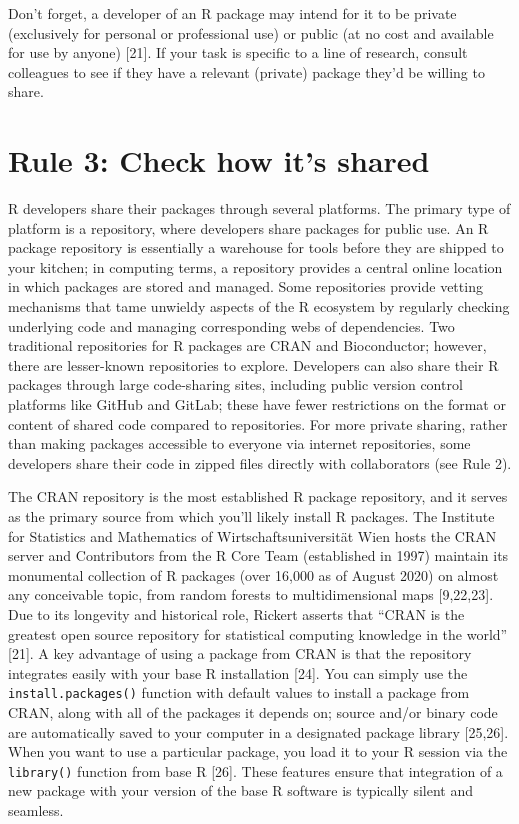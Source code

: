 \documentclass[10pt,letterpaper]{article}
\begin{document}
Don't forget, a developer of an R package may intend for it to be
private (exclusively for personal or professional use) or public (at no
cost and available for use by anyone) {[}21{]}. If your task is specific
to a line of research, consult colleagues to see if they have a relevant
(private) package they'd be willing to share.

\hypertarget{rule-3-check-how-its-shared}{%
\section{Rule 3: Check how it's
shared}\label{rule-3-check-how-its-shared}}

R developers share their packages through several platforms. The primary
type of platform is a repository, where developers share packages for
public use. An R package repository is essentially a warehouse for tools
before they are shipped to your kitchen; in computing terms, a
repository provides a central online location in which packages are
stored and managed. Some repositories provide vetting mechanisms that
tame unwieldy aspects of the R ecosystem by regularly checking
underlying code and managing corresponding webs of dependencies. Two
traditional repositories for R packages are CRAN and Bioconductor;
however, there are lesser-known repositories to explore. Developers can
also share their R packages through large code-sharing sites, including
public version control platforms like GitHub and GitLab; these have
fewer restrictions on the format or content of shared code compared to
repositories. For more private sharing, rather than making packages
accessible to everyone via internet repositories, some developers share
their code in zipped files directly with collaborators (see Rule 2).

The CRAN repository is the most established R package repository, and it
serves as the primary source from which you'll likely install R
packages. The Institute for Statistics and Mathematics of
Wirtschaftsuniversität Wien hosts the CRAN server and Contributors from
the R Core Team (established in 1997) maintain its monumental collection
of R packages (over 16,000 as of August 2020) on almost any conceivable
topic, from random forests to multidimensional maps {[}9,22,23{]}. Due
to its longevity and historical role, Rickert asserts that ``CRAN is the
greatest open source repository for statistical computing knowledge in
the world'' {[}21{]}. A key advantage of using a package from CRAN is
that the repository integrates easily with your base R installation
{[}24{]}. You can simply use the \texttt{install.packages()} function
with default values to install a package from CRAN, along with all of
the packages it depends on; source and/or binary code are automatically
saved to your computer in a designated package library {[}25,26{]}. When
you want to use a particular package, you load it to your R session via
the \texttt{library()} function from base R {[}26{]}. These features
ensure that integration of a new package with your version of the base R
software is typically silent and seamless.
\end{document}
